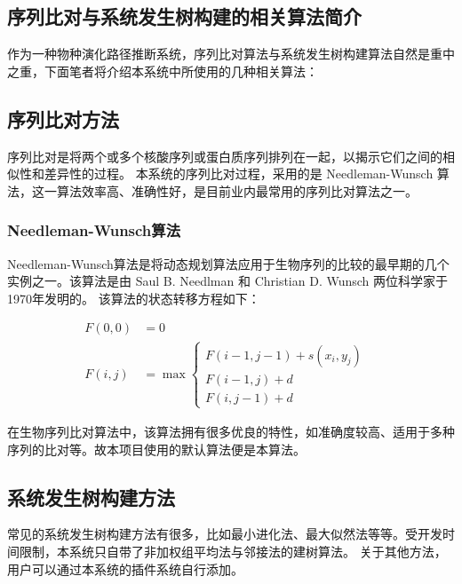 \documentclass{article}
\begin{document}
\begin{multicols}{2}

\section{序列比对与系统发生树构建的相关算法简介}
\par
作为一种物种演化路径推断系统，序列比对算法与系统发生树构建算法自然是重中之重，下面笔者将介绍本系统中所使用的几种相关算法：

\subsection{序列比对方法}
\par
序列比对是将两个或多个核酸序列或蛋白质序列排列在一起，以揭示它们之间的相似性和差异性的过程。
本系统的序列比对过程，采用的是 Needleman-Wunsch 算法，这一算法效率高、准确性好，是目前业内最常用的序列比对算法之一。

\subsubsection{Needleman-Wunsch算法}
\par
Needleman-Wunsch算法是将动态规划算法应用于生物序列的比较的最早期的几个实例之一。该算法是由 Saul B. Needlman 和 Christian D. Wunsch 两位科学家于1970年发明的\cite{ref2}。
该算法的状态转移方程如下：

\begin{equation}
\begin{aligned}
F(0,0) &= 0 \\
F(i,j) &= \max \left\{
      \begin{array}{lr}
      F(i-1,j-1) + s(x_i,y_j) &  \\
      F(i-1,j)+d & \\
      F(i,j-1)+d &
      \end{array}
\right.
\nonumber
\end{aligned}
\end{equation}

\par
在生物序列比对算法中，该算法拥有很多优良的特性，如准确度较高、适用于多种序列的比对等。故本项目使用的默认算法便是本算法。

\subsection{系统发生树构建方法}
\par
常见的系统发生树构建方法有很多，比如最小进化法、最大似然法等等。受开发时间限制，本系统只自带了非加权组平均法与邻接法的建树算法。
关于其他方法，用户可以通过本系统的插件系统自行添加。


\end{multicols}
\end{document}
